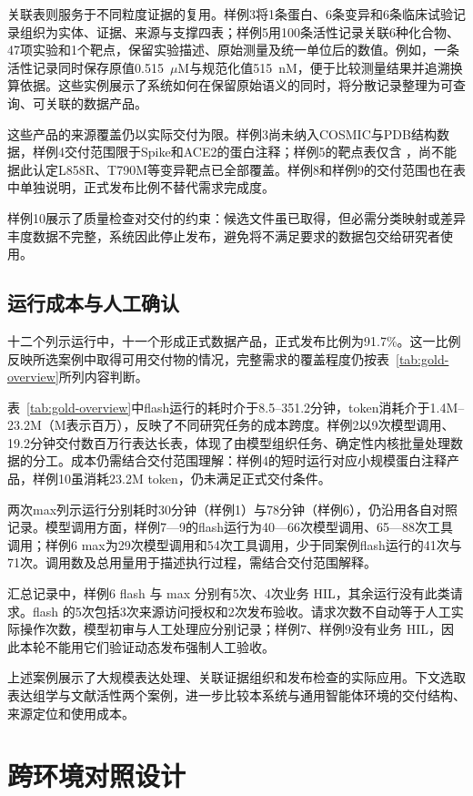 关联表则服务于不同粒度证据的复用。样例3将1条蛋白、6条变异和6条临床试验记录组织为实体、证据、来源与支撑四表；样例5用100条活性记录关联6种化合物、47项实验和1个靶点，保留实验描述、原始测量及统一单位后的数值。例如，一条活性记录同时保存原值0.515~$\mu$M与规范化值515~nM，便于比较测量结果并追溯换算依据。这些实例展示了系统如何在保留原始语义的同时，将分散记录整理为可查询、可关联的数据产品。

这些产品的来源覆盖仍以实际交付为限。样例3尚未纳入COSMIC与PDB结构数据，样例4交付范围限于Spike和ACE2的蛋白注释；样例5的靶点表仅含 ，尚不能据此认定L858R、T790M等变异靶点已全部覆盖。样例8和样例9的交付范围也在表中单独说明，正式发布比例不替代需求完成度。

样例10展示了质量检查对交付的约束：候选文件虽已取得，但必需分类映射或差异丰度数据不完整，系统因此停止发布，避免将不满足要求的数据包交给研究者使用。

\subsection{运行成本与人工确认}\label{sec:corrected-six-run}

十二个列示运行中，十一个形成正式数据产品，正式发布比例为91.7\%。这一比例反映所选案例中取得可用交付物的情况，完整需求的覆盖程度仍按表~\ref{tab:gold-overview}所列内容判断。

表~\ref{tab:gold-overview}中flash运行的耗时介于8.5–351.2分钟，token消耗介于1.4M–23.2M（M表示百万），反映了不同研究任务的成本跨度。样例2以9次模型调用、19.2分钟交付数百万行表达长表，体现了由模型组织任务、确定性内核批量处理数据的分工。成本仍需结合交付范围理解：样例4的短时运行对应小规模蛋白注释产品，样例10虽消耗23.2M token，仍未满足正式交付条件。

两次max列示运行分别耗时30分钟（样例1）与78分钟（样例6），仍沿用各自对照记录。模型调用方面，样例7—9的flash运行为40—66次模型调用、65—88次工具调用；样例6 max为29次模型调用和54次工具调用，少于同案例flash运行的41次与71次。调用数及总用量用于描述执行过程，需结合交付范围解释。

汇总记录中，样例6 flash 与 max 分别有5次、4次业务 HIL，其余运行没有此类请求。flash 的5次包括3次来源访问授权和2次发布验收。请求次数不自动等于人工实际操作次数，模型初审与人工处理应分别记录；样例7、样例9没有业务 HIL，因此本轮不能用它们验证动态发布强制人工验收。

上述案例展示了大规模表达处理、关联证据组织和发布检查的实际应用。下文选取表达组学与文献活性两个案例，进一步比较本系统与通用智能体环境的交付结构、来源定位和使用成本。

\section{跨环境对照设计}\label{sec:factorial-design}

